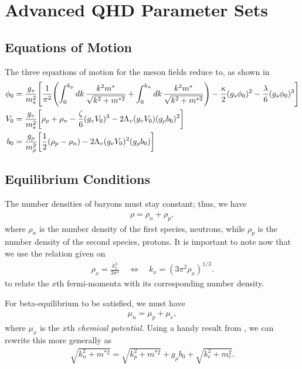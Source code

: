\chapter{Advanced QHD Parameter Sets}

\section{Equations of Motion}

The three equations of motion for the meson fields reduce to, as shown in \autocite[p. 79]{diener_2008}
\begin{align}
    \phi_0 & = \frac{g_s}{m_s^2}\bqty{\frac{1}{\pi^2} \pqty{\int_0^{k_p} \dd{k} \frac{k^2 m^*}{\sqrt{k^2 + m^{*2}}} + \int_0^{k_n} \dd{k} \frac{k^2 m^*}{\sqrt{k^2 + m^{*2}}}} -\frac{\kappa}{2}(g_s\phi_0)^2 -\frac{\lambda}{6}(g_s\phi_0)^3 }\nonumber\\
    V_0 & = \frac{g_v}{m_s^2} \bqty{\rho_p + \rho_n - \frac{\zeta}{6}(g_v V_0)^3 - 2 \Lambda_v (g_vV_0)(g_\rho b_0)^2}\nonumber\\
    b_0 & = \frac{g_\rho}{m_\rho^2} \bqty{\frac{1}{2}(\rho_p - \rho_n) - 2\Lambda_v(g_vV_0)^2(g_\rho b_0)}
\end{align}

\section{Equilibrium Conditions}

The number densities of baryons must stay constant; thus, we have
\begin{align}
    \rho = \rho_n + \rho_p,
\end{align}
where $\rho_n$ is the number density of the first species, neutrons, while $\rho_p$ is the number density of the second species, protons. It is important to note now that we use the relation given on \autocite[p. 90]{diener_2008}
\begin{align*}
    \rho_x = \frac{k_x^3}{3\pi^2} \quad\Longleftrightarrow\quad k_x = (3\pi^2\rho_x)^{1/3}.
\end{align*}
to relate the $x$th fermi-momenta with its corresponding number density.

For beta-equilibrium to be satisfied, we must have
\begin{align}
    \mu_n = \mu_p + \mu_e,
\end{align}
where $\mu_x$ is the $x$th \textit{chemical potential.} Using a handy result from \autocite[p. 90]{diener_2008}, we can rewrite this more generally as
\begin{align}
    \sqrt{k_n^2 + m^{*2}} = \sqrt{k_p^2 + m^{*2}} + g_\rho b_0 + \sqrt{k_e^2 + m_e^2}.
\end{align}

